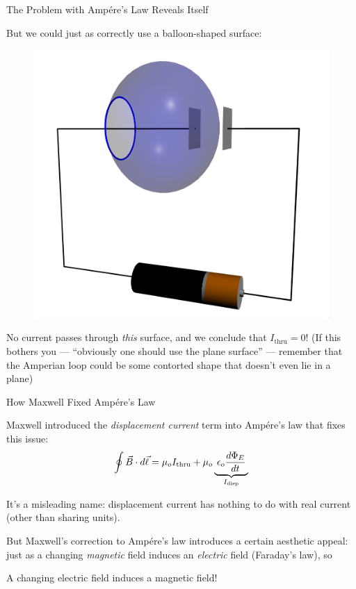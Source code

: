 \documentclass{beamer}
\begin{document}
\begin{frame}{The Problem with Amp{\'e}re's Law Reveals Itself}

But we could just as correctly use a balloon-shaped surface:

\begin{figure}[H]
\centering
\includegraphics[width=0.5\textheight]{figures/duracell_balloon.png}
\end{figure}

No current passes through \emph{this} surface, and we conclude that $I_{\text{thru}} = 0$! (If this bothers you --- ``obviously one should use the plane surface'' --- remember that the Amperian loop could be some contorted shape that doesn't even lie in a plane)

\end{frame}

\begin{frame}{How Maxwell Fixed Amp{\'e}re's Law}

Maxwell introduced the \emph{displacement current} term into Amp{\'e}re's law that fixes this issue:
\begin{equation*}
    \oint \vec{B} \cdot d\vec{\ell} = \mu_o I_{\text{thru}} + \mu_o \underbrace{\hspace{0.25em}\epsilon_o \frac{d\Phi_E}{dt}\hspace{0.25em}}_{I_{\text{disp}}}
\end{equation*}

It's a misleading name: displacement current has nothing to do with real current (other than sharing units).

\vfill

But Maxwell's correction to Amp{\'e}re's law introduces a certain aesthetic appeal: just as a changing \emph{magnetic} field induces an \emph{electric} field (Faraday's law), so
\begin{center}
    A changing electric field induces a magnetic field!
\end{center}

\end{frame}
\end{document}
